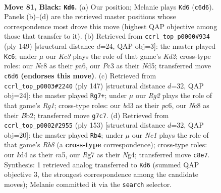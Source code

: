 \documentclass[11pt]{article}
\begin{document}
\clearpage

\begin{figure}[p]\centering
\begin{subfigure}{0.46\textwidth}\centering
\resizebox{\linewidth}{!}{%
\newchessgame
\chessboard[
  setfen={2n5/6r1/P1k5/7R/3K4/2pB2PP/2P5/8 b - - 2 81},
  showmover=false,
  pgfstyle=straightmove, color=movearrow, markmove={c6-d6}
]}
\caption{}
\end{subfigure}\hfill
\begin{subfigure}{0.46\textwidth}\centering
\resizebox{\linewidth}{!}{%
\newchessgame
\chessboard[
  setfen={6r1/1R1k2P1/P7/3n4/3B4/1P1K4/8/8 b - - 2 75},
  showmover=false,
  pgfstyle=straightmove, color=movearrow, markmove={d7-c6}
]}
\caption{}
\end{subfigure}
\\[4pt]
\begin{subfigure}{0.46\textwidth}\centering
\resizebox{\linewidth}{!}{%
\newchessgame
\chessboard[
  setfen={6r1/2pK4/2P3Pk/8/8/8/1b6/1B1R4 b - - 8 74},
  showmover=false,
  pgfstyle=straightmove, color=movearrow, markmove={g8-g7}
]}
\caption{}
\end{subfigure}\hfill
\begin{subfigure}{0.46\textwidth}\centering
\resizebox{\linewidth}{!}{%
\newchessgame
\chessboard[
  setfen={8/B5pk/8/R7/p5n1/6P1/5PK1/1r6 b - - 13 77},
  showmover=false,
  pgfstyle=straightmove, color=movearrow, markmove={b1-b4}
]}
\caption{}
\end{subfigure}
\caption{\textbf{Move 81, Black: \texttt{Kd6}.} (a) Our position; Melanie plays \texttt{Kd6} (\texttt{c6d6}). Panels (b)--(d) are the retrieved master positions whose correspondence most drove this move (highest QAP objective among those that transfer to it). (b) Retrieved from \texttt{ccrl\_top\_p0000\#934} (ply 149) [structural distance $d$=24, QAP obj=3]: the master played \texttt{Kc6}; under $\mu$ our \emph{Kc3} plays the role of that game's \emph{Kd2}; cross-type roles: our \emph{N}c8 as their \emph{p}a6, our \emph{P}c3 as their \emph{N}d5; transferred move \texttt{c6d6} \textbf{(endorses this move)}. (c) Retrieved from \texttt{ccrl\_top\_p0003\#2240} (ply 147) [structural distance $d$=32, QAP obj=24]: the master played \texttt{Rg7+}; under $\mu$ our \emph{Rg2} plays the role of that game's \emph{Rg1}; cross-type roles: our \emph{b}d3 as their \emph{p}c6, our \emph{N}c8 as their \emph{B}b2; transferred move \texttt{g7c7}. (d) Retrieved from \texttt{ccrl\_top\_p0002\#2955} (ply 153) [structural distance $d$=32, QAP obj=20]: the master played \texttt{Rb4}; under $\mu$ our \emph{Nc1} plays the role of that game's \emph{Rb8} (a \textbf{cross-type} correspondence); cross-type roles: our \emph{k}d4 as their \emph{r}a5, our \emph{R}g7 as their \emph{N}g4; transferred move \texttt{c8e7}. Synthesis: 1 retrieved analog transferred to \texttt{Kd6} (summed QAP objective 3, the strongest correspondence among the candidate moves); Melanie committed it via the \texttt{search} selector.}
\label{fig:thought-m161}
\end{figure}
\end{document}
